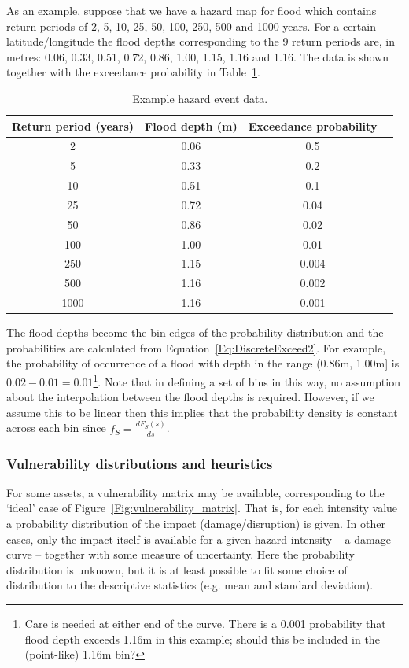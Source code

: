 \documentclass[a4paper,11pt]{extarticle} %
\begin{document}
As an example, suppose that we have a hazard map for flood which contains return periods of 2, 5, 10, 25, 50, 100, 250, 500 and 1000 years. For a certain latitude/longitude the flood depths corresponding to the 9 return periods are, in metres: 0.06, 0.33, 0.51, 0.72, 0.86, 1.00, 1.15, 1.16 and 1.16. The data is shown together with the exceedance probability in Table~\ref{Table:HazardData}.

\begin{table}[ht]
    \caption{Example hazard event data.}
    \centering
    \begin{tabular}{c c c c}
        \hline
        Return period (years) & Flood depth (m) & Exceedance probability  \\ [0.5ex]
        \hline
        2 & 0.06 & 0.5 \\
        5 & 0.33 & 0.2 \\
        10 & 0.51 & 0.1 \\
        25 & 0.72 & 0.04 \\
        50 & 0.86 & 0.02 \\
        100 & 1.00 & 0.01 \\
        250 & 1.15 & 0.004 \\
        500 & 1.16 & 0.002 \\
        1000 & 1.16 & 0.001 \\
        \hline
    \end{tabular}
    \label{Table:HazardData}
\end{table}

The flood depths become the bin edges of the probability distribution and the probabilities are calculated from Equation~\ref{Eq:DiscreteExceed2}. For example, the probability of occurrence of a flood with depth in the range (0.86m,  1.00m] is $0.02 - 0.01 = 0.01$\footnote{Care is needed at either end of the curve. There is a 0.001 probability that flood depth exceeds 1.16m in this example; should this be included in the (point-like) 1.16m bin?}. Note that in defining a set of bins in this way, no assumption about the interpolation between the flood depths is required. However, if we assume this to be linear then this implies that the probability density is constant across each bin since $f_S = \frac{dF_S(s)}{ds}$.


\subsubsection{Vulnerability distributions and heuristics}
For some assets, a vulnerability matrix may be available, corresponding to the `ideal' case  of Figure~\ref{Fig:vulnerability_matrix}. That is, for each intensity value a probability distribution of the impact (damage/disruption) is given. In other cases, only the impact itself is available for a given hazard intensity -- a damage curve -- together with some measure of uncertainty. Here the probability distribution is unknown, but it is at least possible to fit some choice of distribution to the descriptive statistics (e.g. mean and standard deviation).
\end{document}
